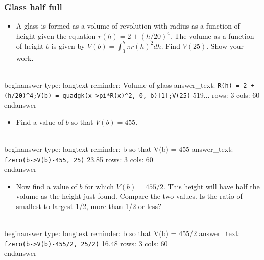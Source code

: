 \documentclass[12pt]{article}
\begin{document}
\subsubsection{Glass half full}\begin{itemize}\item A glass is formed as a volume of revolution with radius as a   function of height given the equation $r(h) = 2 + (h/20)^4$. The   volume as a function of height $b$ is given by $V(b) = \int_0^b \pi   r(h)^2 dh$. Find $V(25)$. Show your work.\end{itemize}
\\begin{answer}
type: longtext
reminder: Volume of glass
answer_text: \verb#R(h) = 2 + (h/20)^4;V(b) = quadgk(x->pi*R(x)^2, 0, b)[1];V(25)# 519... 
rows: 3
cols: 60
\\end{answer}
\begin{itemize}\item Find a value of $b$ so that $V(b) = 455$.\end{itemize}
\\begin{answer}
type: longtext
reminder: b so that V(b) = 455
answer_text: \verb#fzero(b->V(b)-455, 25)# 23.85 
rows: 3
cols: 60
\\end{answer}
\begin{itemize}\item Now find a value of $b$ for which $V(b) = 455/2$. This height will   have half the volume as the height just found. Compare the two   values. Is the ratio of smallest to largest 1/2, more than 1/2 or   less?\end{itemize}
\\begin{answer}
type: longtext
reminder: b so that V(b) = 455/2
answer_text: \verb#fzero(b->V(b)-455/2, 25/2)# 16.48 
rows: 3
cols: 60
\\end{answer}
\end{document}
